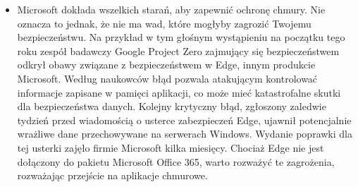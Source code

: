 \documentclass[12pt]{article}
\renewcommand{\_}{\kern-1.5pt\textunderscore\kern-1.5pt}
\begin{document}
\begin{itemize}
\begin{itemize}
\begin{itemize}
\vspace{\baselineskip}
	\item Microsoft dokłada wszelkich starań, aby zapewnić ochronę chmury. Nie oznacza to jednak, że nie ma wad, które mogłyby zagrozić Twojemu bezpieczeństwu. Na przykład w tym głośnym wystąpieniu na początku tego roku zespół badawczy Google Project Zero zajmujący się bezpieczeństwem odkrył obawy związane z bezpieczeństwem w Edge, innym produkcie Microsoft. Według naukowców błąd pozwala atakującym kontrolować informacje zapisane w pamięci aplikacji, co może mieć katastrofalne skutki dla bezpieczeństwa danych. Kolejny krytyczny błąd, zgłoszony zaledwie tydzień przed wiadomością o usterce zabezpieczeń Edge, ujawnił potencjalnie wrażliwe dane przechowywane na serwerach Windows. Wydanie poprawki dla tej usterki zajęło firmie Microsoft kilka miesięcy. Chociaż Edge nie jest dołączony do pakietu Microsoft Office 365, warto rozważyć te zagrożenia, rozważając przejście na aplikacje chmurowe.
\end{itemize}
\end{itemize}
\end{itemize}\par


\vspace{\baselineskip}

\vspace{\baselineskip}

\printbibliography
\end{document}
